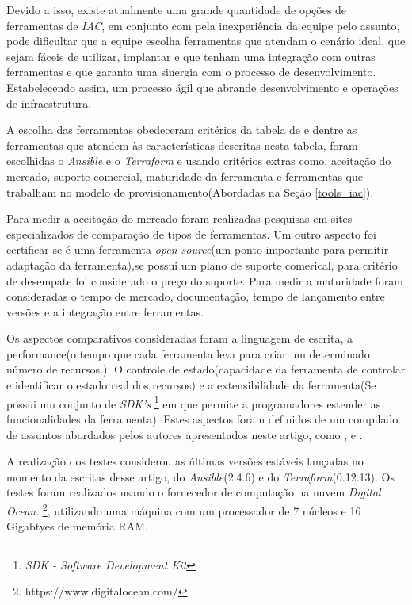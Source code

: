 Devido a isso, existe atualmente uma grande quantidade de opções de ferramentas de \textit{IAC}, em conjunto com pela inexperiência da equipe pelo assunto, pode dificultar que a equipe escolha ferramentas que atendam o cenário ideal, que sejam fáceis de utilizar, implantar e que tenham uma integração com outras ferramentas e que garanta uma sinergia com o processo de desenvolvimento. Estabelecendo assim, um processo ágil que abrande desenvolvimento e operações de infraestrutura.  

A escolha das ferramentas obedeceram critérios da tabela de  e dentre as ferramentas que atendem às características descritas nesta tabela, foram escolhidas o \textit{Ansible} e o \textit{Terraform} e usando critérios extras como, aceitação do mercado, suporte comercial, maturidade da ferramenta e ferramentas que trabalham no modelo de provisionamento(Abordadas na Seção \ref{tools_iac}).

Para medir a aceitação do mercado foram realizadas pesquisas em sites especializados de comparação de tipos de ferramentas. Um outro aspecto foi certificar se é uma ferramenta \textit{open source}(um ponto importante para permitir adaptação da ferramenta),se possui um plano de suporte comerical, para critério de desempate foi considerado o preço do suporte. Para medir a maturidade foram consideradas o tempo de mercado, documentação, tempo de lançamento entre versões e a integração entre ferramentas.

Os aspectos comparativos consideradas foram a linguagem de escrita, a performance(o tempo que cada ferramenta leva para criar um determinado número de recursos.). O controle de estado(capacidade da ferramenta  de controlar e identificar o estado real dos recursos) e a extensibilidade da ferramenta(Se possui um conjunto de \textit{SDK's} \footnote{\textit{SDK - Software Development Kit}} em que permite a programadores estender as funcionalidades da ferramenta).  Estes aspectos foram definidos de um compilado de assuntos abordados pelos autores apresentados neste artigo, como \cite{steve}, \cite{masek} e \cite{Morris:2016:ICM:3006361}.

A realização dos testes considerou as últimas versões estáveis lançadas no momento da escritas desse artigo, do \textit{Ansible}(2.4.6) e do \textit{Terraform}(0.12.13). Os testes foram realizados usando o fornecedor de computação na nuvem  \textit{Digital Ocean}. \footnote{https://www.digitalocean.com/}, utilizando uma máquina com um processador de 7 núcleos e 16 Gigabtyes de memória RAM.   



